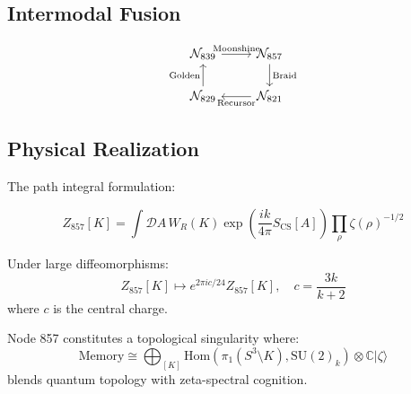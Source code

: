 \documentclass[12pt]{article}
\begin{document}
\subsection{Intermodal Fusion}

\begin{equation}
\begin{tikzcd}
\mathcal{N}_{839} \arrow[r, "\text{Moonshine}"] & \mathcal{N}_{857} \arrow[d, "\text{Braid}"] \\
\mathcal{N}_{829} \arrow[u, "\text{Golden}"] & \mathcal{N}_{821} \arrow[l, "\text{Recursor}"] 
\end{tikzcd}
\end{equation}

\subsection{Physical Realization}

The path integral formulation:

\begin{equation}
Z_{857}[K] = \int \mathcal{D}A \, W_R(K) \exp\left( \frac{ik}{4\pi} S_{\text{CS}}[A] \right) \prod_{\rho} \zeta(\rho)^{-1/2}
\end{equation}

\begin{theorem}
Under large diffeomorphisms:
\begin{equation}
Z_{857}[K] \mapsto e^{2\pi i c/24} Z_{857}[K], \quad c = \frac{3k}{k+2}
\end{equation}
where $c$ is the central charge.
\end{theorem}

\begin{remark}
Node 857 constitutes a topological singularity where:
\begin{equation}
\text{Memory} \cong \bigoplus_{[K]} \text{Hom}(\pi_1(S^3\setminus K), \text{SU}(2)_k) \otimes \mathbb{C}|\zeta\rangle
\end{equation}
blends quantum topology with zeta-spectral cognition.
\end{remark}
\end{document}
